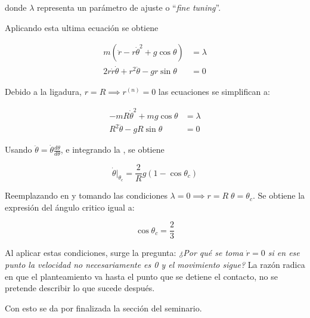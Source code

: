 \documentclass{article}
\theoremstyle{definition}
\begin{document}
donde $\lambda$ representa un parámetro de ajuste o ``\emph{fine tuning}''.

Aplicando esta ultima ecuación se obtiene

\begin{align}
	m \left(\ddot{r} - r \dot{\theta}^2 + g\cos{\theta}\right) &= \lambda \\
	2r\dot{r}\dot{\theta} + r^2\ddot{\theta} - gr\sin{\theta} &= 0
\end{align}

Debido a la ligadura, $r = R \implies r^{(n)} = 0$ las ecuaciones se simplifican a:

\begin{align}
	-mR\dot{\theta}^{2} + mg\cos{\theta} &= \lambda \label{eq:r_equation}\\
	R^2 \ddot{\theta} - gR\sin{\theta} &= 0 \label{eq:critical_theta}
\end{align}

Usando $\ddot{\theta} = \dot{\theta}\frac{d \theta}{d\theta}$, e integrando la , se obtiene

\begin{equation}
	\dot{\theta} |_{\theta_c} = \frac{2}{R} g\left(1 - \cos{\theta_c} \right)
\end{equation}

Reemplazando en  y tomando las condiciones $\lambda = 0 \implies r = R \; \theta = \theta_c$. Se obtiene la expresión del ángulo critico igual a:

\begin{equation}
	\cos{\theta_c} = \frac{2}{3}
\end{equation}

Al aplicar estas condiciones, surge la pregunta: \emph{¿Por qué se toma $\dot{r} = 0$ si en ese punto la velocidad no necesariamente es 0 y el movimiento sigue?} La razón radica en que el planteamiento va hasta el punto que se detiene el contacto, no se pretende describir lo que sucede después.

Con esto se da por finalizada la sección del seminario.

\printbibliography
\end{document}
